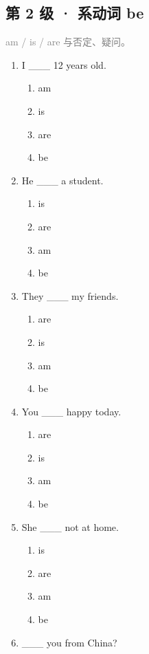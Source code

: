 \documentclass[11pt,a4paper]{ctexart}
\begin{document}
\subsection*{第 2 级 · 系动词 be}
\noindent\textcolor{gray}{am / is / are 与否定、疑问。}\par\smallskip
\begin{enumerate}[leftmargin=*,itemsep=4pt]
\item I \_\_\_ 12 years old.
\begin{enumerate}[label=\Alph*.,leftmargin=2em,itemsep=1pt,topsep=2pt]
\item am
\item is
\item are
\item be
\end{enumerate}
\item He \_\_\_ a student.
\begin{enumerate}[label=\Alph*.,leftmargin=2em,itemsep=1pt,topsep=2pt]
\item is
\item are
\item am
\item be
\end{enumerate}
\item They \_\_\_ my friends.
\begin{enumerate}[label=\Alph*.,leftmargin=2em,itemsep=1pt,topsep=2pt]
\item are
\item is
\item am
\item be
\end{enumerate}
\item You \_\_\_ happy today.
\begin{enumerate}[label=\Alph*.,leftmargin=2em,itemsep=1pt,topsep=2pt]
\item are
\item is
\item am
\item be
\end{enumerate}
\item She \_\_\_ not at home.
\begin{enumerate}[label=\Alph*.,leftmargin=2em,itemsep=1pt,topsep=2pt]
\item is
\item are
\item am
\item be
\end{enumerate}
\item \_\_\_ you from China?

\end{enumerate}
\end{document}
